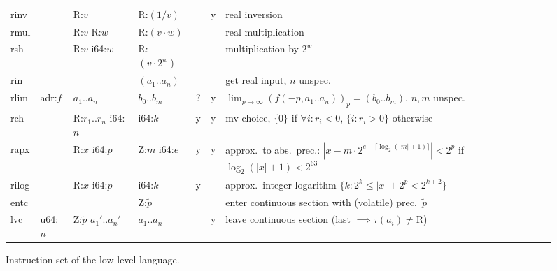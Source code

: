 \documentclass[a4paper,parskip=half]{scrartcl}
\begin{document}
\begin{figure}[h]
\begin{tabular}{l|l|l|l@{\;\,\vline\,}c@{\,\vline\,}c@{\,\vline\;\,}p{9cm}}
  \ttfamily rinv  &         & R:$v$           & R:$(1/v)$       & &y& real inversion \\
  \ttfamily rmul  &         & R:$v$ R:$w$     & R:$(v\cdot w)$  & && real multiplication \\
  \ttfamily rsh   &         & R:$v$ i64:$w$   & R:$(v\cdot2^w)$ & && multiplication by $2^w$ \\
  \ttfamily rin   &         &                 & $(a_1..a_n)$    & && get real input, $n$ unspec. \\
  \hline
  \ttfamily rlim  & adr:$f$ & $a_1..a_n$ & $b_0..b_m$ &?&y& $\lim_{p\to\infty}{(f(-p,a_1..a_n))_p} = (b_0..b_m)$, $n,m$ unspec. \\[-1.35ex]\hline\noalign{\vspace{\dimexpr 1.35ex-.5pt}}
  \ttfamily rch   &         & R:$r_1..r_n$ i64:$n$ & i64:$k$    &y&y& mv-choice, $\{0\}$ if $\forall i:r_i<0$, $\{i:r_i>0\}$ otherwise \\
  \ttfamily rapx  &         & R:$x$ i64:$p$   & Z:$m$ i64:$e$   &y&y& approx.\ to abs.\ prec.: $|x-m\cdot2^{e-\lceil\log_2(|m|+1)\rceil}|<2^p$ if $\log_2(|x|+1)<2^{63}$ \\
  \ttfamily rilog &         & R:$x$ i64:$p$   & i64:$k$         &y&& approx.\ integer logarithm $\{k:2^k\leq|x|+2^p<2^{k+2}\}$ \\[-1.35ex]\hline\noalign{\vspace{\dimexpr 1.35ex-.5pt}}
  \hline
  \ttfamily entc  &         &                           & Z:$\tilde p$ && & enter continuous section with (volatile) prec.\ $\tilde p$ \\
  \ttfamily lvc   & u64:$n$ & Z:$\tilde p$ $a_1'..a_n'$ & $a_1..a_n$   &&y& leave continuous section (last $\implies\tau(a_i)\neq\text{R}$)
\end{tabular}
\caption{Instruction set of the low-level language.}
\label{fig:instrs}
\end{figure}

\restoregeometry
\newpage

\newcommand*\dom{\operatorname{dom}}
\newcommand*\Top{\operatorname{top}}
\end{document}
